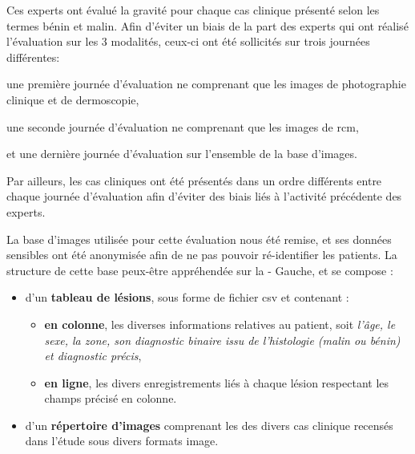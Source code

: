 Ces experts ont évalué la gravité pour chaque cas clinique présenté selon les termes bénin et malin. Afin d'éviter un biais de la part des experts qui ont réalisé l'évaluation sur les 3 modalités, ceux-ci ont été sollicités sur trois journées différentes: 
\begin{inlinerate}
    \item une première journée d'évaluation ne comprenant que les images de photographie clinique et de dermoscopie,
    \item une seconde journée d'évaluation ne comprenant que les images de \gls{rcm},
    \item et une dernière journée d'évaluation sur l'ensemble de la base d'images.
\end{inlinerate}
Par ailleurs, les cas cliniques ont été présentés dans un ordre différents entre chaque journée d'évaluation afin d'éviter des biais liés à l'activité précédente des experts.\par

La base d'images utilisée pour cette évaluation nous été remise, et ses données sensibles ont été anonymisée afin de ne pas pouvoir ré-identifier les patients. La structure de cette base peux-être appréhendée sur la  - Gauche, et se compose :
\begin{itemize}
    \item d'un \textbf{tableau de lésions}, sous forme de fichier \gls{csv} et contenant :
    \begin{itemize}
        \item \textbf{en colonne}, les diverses informations relatives au patient, soit \textit{l'âge, le sexe, la zone, son diagnostic binaire issu de l'histologie (malin ou bénin) et diagnostic précis},
        \item \textbf{en ligne}, les divers enregistrements liés à chaque lésion respectant les champs précisé en colonne.
    \end{itemize}
    \item d'un \textbf{répertoire d'images} comprenant les des divers cas clinique recensés dans l'étude sous divers formats image.
\end{itemize}\par

